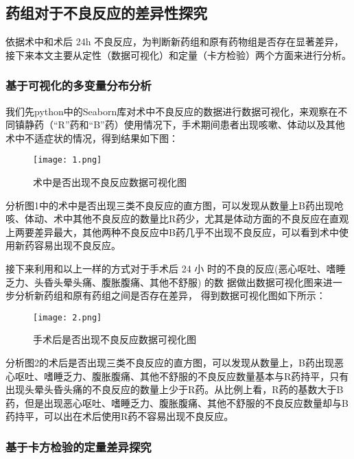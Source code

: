 \subsection{药组对于不良反应的差异性探究}

依据术中和术后 24h 不良反应，为判断新药组和原有药物组是否存在显著差异，接下来本文主要从定性（数据可视化）和定量（卡方检验）两个方面来进行分析。

\subsubsection{基于可视化的多变量分布分析}

我们先python中的Seaborn库对术中不良反应的数据进行数据可视化，来观察在不同镇静药（“R”药和“B”药）使用情况下，手术期间患者出现咳嗽、体动以及其他术中不适症状的情况，得到结果如下图：

\begin{figure}[H] %
	\centering %
	\texttt{[image: 1.png]} 
	\caption{术中是否出现不良反应数据可视化图} 
	\label{Fig.main1} 
\end{figure}

分析图1中的术中是否出现三类不良反应的直方图，可以发现从数量上B药出现呛咳、体动、术中其他不良反应的数量比R药少，尤其是体动方面的不良反应在直观上两要差异最大，其他两种不良反应中B药几乎不出现不良反应，可以看到术中使用新药容易出现不良反应。

接下来利用和以上一样的方式对于手术后 24 小 时的不良的反应(恶心呕吐、嗜睡乏力、头昏头晕头痛、腹胀腹痛、其他不舒服) 的数 据做出数据可视化图来进一步分析新药组和原有药组之间是否存在差异， 得到数据可视化图如下所示：

\begin{figure}[H] %
	\centering %
	\texttt{[image: 2.png]} 
	\caption{手术后是否出现不良反应数据可视化图} 
	\label{Fig.main2} 
\end{figure}

分析图2的术后是否出现三类不良反应的直方图，可以发现从数量上，B药出现恶心呕吐、嗜睡乏力、腹胀腹痛、其他不舒服的不良反应数量基本与R药持平，只有出现头晕头昏头痛的不良反应的数量上少于R药。从比例上看，R药的基数大于B药，但是出现恶心呕吐、嗜睡乏力、腹胀腹痛、其他不舒服的不良反应数量却与B药持平，可以出在术后使用R药不容易出现不良反应。


\subsubsection{基于卡方检验的定量差异探究}


